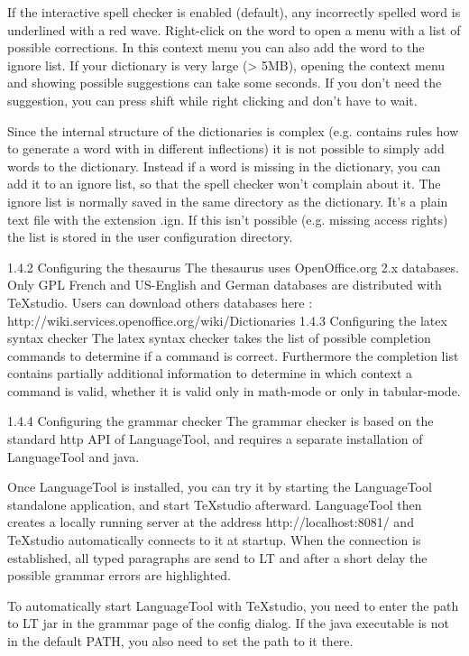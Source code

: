 \documentclass{article}
\begin{document}
	If the interactive spell checker is enabled (default), any incorrectly spelled word is underlined with a red wave. Right-click on the word to open a menu with a list of possible corrections. In this context menu you can also add the word to the ignore list. If your dictionary is very large (> 5MB), opening the context menu and showing possible suggestions can take some seconds. If you don't need the suggestion, you can press shift while right clicking and don't have to wait.
	
	Since the internal structure of the dictionaries is complex (e.g. contains rules how to generate a word with in different inflections) it is not possible to simply add words to the dictionary. Instead if a word is missing in the dictionary, you can add it to an ignore list, so that the spell checker won't complain about it. The ignore list is normally saved in the same directory as the dictionary. It's a plain text file with the extension .ign. If this isn't possible (e.g. missing access rights) the list is stored in the user configuration directory.
	
	1.4.2 Configuring the thesaurus
	The thesaurus uses OpenOffice.org 2.x databases. Only GPL French and US-English and German databases are distributed with TeXstudio.
	Users can download others databases here : http://wiki.services.openoffice.org/wiki/Dictionaries
	1.4.3 Configuring the latex syntax checker
	The latex syntax checker takes the list of possible completion commands to determine if a command is correct. Furthermore the completion list contains partially additional information to determine in which context a command is valid, whether it is valid only in math-mode or only in tabular-mode.
	
	1.4.4 Configuring the grammar checker
	The grammar checker is based on the standard http API of LanguageTool, and requires a separate installation of LanguageTool and java.
	
	Once LanguageTool is installed, you can try it by starting the LanguageTool standalone application, and start TeXstudio afterward. LanguageTool then creates a locally running server at the address http://localhost:8081/ and TeXstudio automatically connects to it at startup. When the connection is established, all typed paragraphs are send to LT and after a short delay the possible grammar errors are highlighted.
	
	To automatically start LanguageTool with TeXstudio, you need to enter the path to LT jar in the grammar page of the config dialog. If the java executable is not in the default PATH, you also need to set the path to it there.
	
\end{document}
